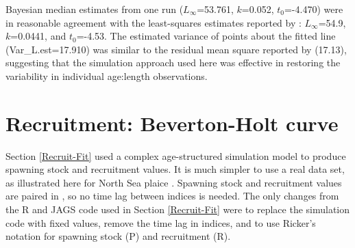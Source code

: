 \documentclass[
]{krantz}
\makeatletter
\newenvironment{Shaded}{\begin{snugshade}}{\end{snugshade}}
\newcommand{\AttributeTok}[1]{\textcolor[rgb]{0.27,0.27,0.27}{#1}}
\newcommand{\CommentTok}[1]{\textcolor[rgb]{0.37,0.37,0.37}{\textit{#1}}}
\newcommand{\ConstantTok}[1]{\textcolor[rgb]{0.37,0.37,0.37}{#1}}
\newcommand{\ControlFlowTok}[1]{\textcolor[rgb]{0.27,0.27,0.27}{\textbf{#1}}}
\newcommand{\DecValTok}[1]{\textcolor[rgb]{0.06,0.06,0.06}{#1}}
\newcommand{\FunctionTok}[1]{\textcolor[rgb]{0.27,0.27,0.27}{\textbf{#1}}}
\newcommand{\NormalTok}[1]{#1}
\newcommand{\OtherTok}[1]{\textcolor[rgb]{0.37,0.37,0.37}{#1}}
\newcommand{\SpecialCharTok}[1]{\textcolor[rgb]{0.43,0.43,0.43}{\textbf{#1}}}
\newcommand{\StringTok}[1]{\textcolor[rgb]{0.5,0.5,0.5}{#1}}
\newenvironment{kframe}{%
\medskip{}
\setlength{\fboxsep}{.8em}
 \def\at@end@of@kframe{}%
 \ifinner\ifhmode%
  \def\at@end@of@kframe{\end{minipage}}%
  \begin{minipage}{\columnwidth}%
 \fi\fi%
 \def\FrameCommand##1{\hskip\@totalleftmargin \hskip-\fboxsep
 \colorbox{shadecolor}{##1}\hskip-\fboxsep
     \hskip-\linewidth \hskip-\@totalleftmargin \hskip\columnwidth}%
 \MakeFramed {\advance\hsize-\width
   \@totalleftmargin\z@ \linewidth\hsize
   \@setminipage}}%
 {\par\unskip\endMakeFramed%
 \at@end@of@kframe}
\renewenvironment{Shaded}{\begin{kframe}}{\end{kframe}}
\makeatother
\begin{document}
\begin{Shaded}
\end{Shaded}

Bayesian median estimates from one run (\(L_\infty\)=53.761, \(k\)=0.052, \(t_0\)=-4.470) were in reasonable agreement with the least-squares estimates reported by \citet{quinn.deriso_1999}: \(L_\infty\)=54.9, \(k\)=0.0441, and \(t_0\)=-4.53. The estimated variance of points about the fitted line (Var\_L.est=17.910) was similar to the residual mean square reported by \citet{quinn.deriso_1999} (17.13), suggesting that the simulation approach used here was effective in restoring the variability in individual age:length observations.

\hypertarget{Recruit-FitRealData}{%
\section{Recruitment: Beverton-Holt curve}\label{Recruit-FitRealData}}

Section \ref{Recruit-Fit} used a complex age-structured simulation model to produce spawning stock and recruitment values. It is much simpler to use a real data set, as illustrated here for North Sea plaice \citep{ricker1975}. Spawning stock and recruitment values are paired in \citet{ricker1975}, so no time lag between indices is needed. The only changes from the R and JAGS code used in Section \ref{Recruit-Fit} were to replace the simulation code with fixed values, remove the time lag in indices, and to use Ricker's notation for spawning stock (P) and recruitment (R).
\end{document}
